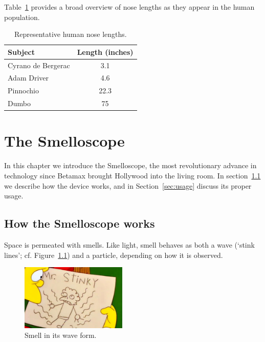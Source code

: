 \documentclass[singlespace]{../unmthesis}
\begin{document}
Table~\ref{tab:lengths} provides a broad overview of nose lengths as they appear in the human population.

%
%
\begin{table}[ht]
    \centering
    \begin{tabular}{lc}
        \toprule
				Subject & Length (inches)\\
				\midrule
			  Cyrano de Bergerac & 3.1\\
				Adam Driver & 4.6\\
        Pinnochio & 22.3 \\
        Dumbo & 75\\
        \bottomrule
    \end{tabular}
    \caption{Representative human nose lengths.}
    \label{tab:lengths}
\end{table}

\chapter{The Smelloscope}\label{chapter:02}

In this chapter we introduce the Smelloscope, the most revolutionary advance in technology since Betamax brought 
Hollywood into the living room. In section~\ref{sec:smelloscope} we describe how the device works, and in Section~\ref{sec:usage} discuss its proper usage. 

\section{How the Smelloscope works}\label{sec:smelloscope}

Space is permeated with smells. Like light, smell behaves as both a wave (`stink lines'; cf. 
Figure~\ref{fig:stink-lines}) and a particle, depending on how it is observed. 
\begin{figure}[h]
\centering
\includegraphics[width=0.45\textwidth]{./figures/stink-lines}
\caption{Smell in its wave form.}
\label{fig:stink-lines}
\end{figure}
\end{document}
